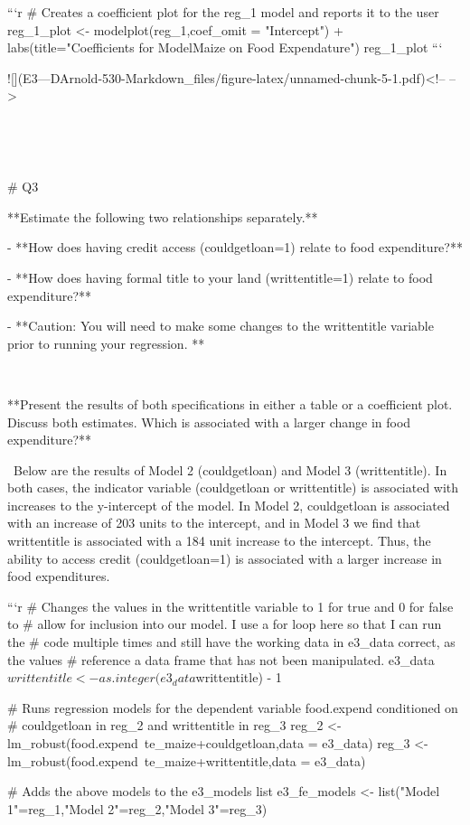 \documentclass[
]{article}
\begin{document}
\begin{}
```r
# Creates a coefficient plot for the reg_1 model and reports it to the user
reg_1_plot <- modelplot(reg_1,coef_omit = "Intercept") + labs(title="Coefficients for Model\nTE Maize on Food Expendature")
reg_1_plot
```

![](E3---DArnold-530-Markdown_files/figure-latex/unnamed-chunk-5-1.pdf)<!-- --> 
\

\

\


# Q3 

**Estimate the following two relationships separately.**

- **How does having credit access (couldgetloan=1) relate to food expenditure?**

- **How does having formal title to your land (writtentitle=1) relate to food expenditure?**

- **Caution: You will need to make some changes to the writtentitle variable prior to running your regression. **


\

**Present the results of both specifications in either a table or a coefficient plot. Discuss both estimates. Which is associated with a larger change in food expenditure?**


\
Below are the results of Model 2 (couldgetloan) and Model 3 (writtentitle). In both cases, the indicator variable (couldgetloan or writtentitle) is associated with increases to the y-intercept of the model. In Model 2, couldgetloan is associated with an increase of 203 units to the intercept, and in Model 3 we find that writtentitle is associated with a 184 unit increase to the intercept. Thus, the ability to access credit (couldgetloan=1) is associated with a larger increase in food expenditures. 
\

```r
# Changes the values in the writtentitle variable to 1 for true and 0 for false to 
# allow for inclusion into our model. I use a for loop here so that I can run the
# code multiple times and still have the working data in e3_data correct, as the values
# reference a data frame that has not been manipulated. 
e3_data$writtentitle <- as.integer(e3_data$writtentitle) - 1


# Runs regression models for the dependent variable food.expend conditioned on 
# couldgetloan in reg_2 and writtentitle in reg_3
reg_2 <- lm_robust(food.expend~te_maize+couldgetloan,data = e3_data)
reg_3 <- lm_robust(food.expend~te_maize+writtentitle,data = e3_data)

# Adds the above models to the e3_models list
e3_fe_models <- list("Model 1"=reg_1,"Model 2"=reg_2,"Model 3"=reg_3)


\end{}
\end{document}
